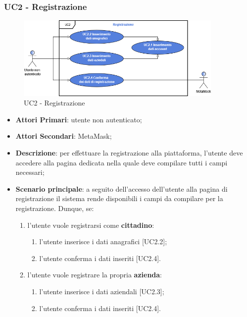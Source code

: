 \subsubsection{UC2 - Registrazione}
\begin{figure}[H]
	\includegraphics[width=10cm]{res/images/UC2.png}
	\centering
	\caption{UC2 - Registrazione}
\end{figure}
\begin{itemize}
	\item \textbf{Attori Primari}: utente non autenticato;
	\item \textbf{Attori Secondari}: MetaMask\glo;
	\item \textbf{Descrizione}: per effettuare la registrazione alla piattaforma, l'utente deve accedere alla pagina dedicata nella quale deve compilare tutti i campi necessari;
	\item \textbf{Scenario principale}: a seguito dell'accesso dell'utente alla pagina di registrazione il sistema rende disponibili i campi da compilare per la registrazione. Dunque, se:
	\begin{enumerate}[label=\alph*.]
	
		\item l'utente vuole registrarsi come \textbf{cittadino}: 
		\begin{enumerate}[label=\roman*.]
			\item l'utente inserisce i dati anagrafici [UC2.2];
			\item l'utente conferma i dati inseriti [UC2.4].
		\end{enumerate}
		
		
		\item l'utente vuole registrare la propria \textbf{azienda}:
		\begin{enumerate}[label=\roman*.]
			\item l'utente inserisce i dati aziendali [UC2.3];
			\item l'utente conferma i dati inseriti [UC2.4].
		\end{enumerate}
	

\end{enumerate}
\end{itemize}
